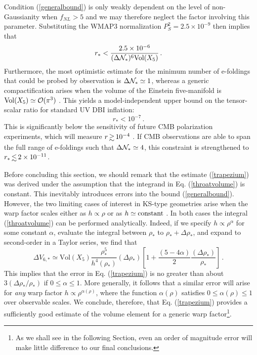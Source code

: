Condition (\ref{generalbound}) is 
only weakly dependent on the level of non-Gaussianity 
when $f_{NL} > 5$ and we may therefore neglect the 
factor involving this parameter. Substituting the WMAP3 normalization 
$P_S^2 = 2.5 \times 10^{-9}$ then implies that 
\begin{equation}
\label{upperbound}
r_{*} < \frac{2.5\times 10^{-6}}{( \Delta {\cal{N}}_*)^6 \mathrm{Vol}(X_5)} \,.
\end{equation}
Furthermore, the most optimistic 
estimate for the minimum number of e-foldings that could be 
probed by observation is $\Delta {\cal{N}}_{*} \simeq 1$, whereas
a generic compactification arises when 
the volume of the Einstein five-manifold is $\mathrm{Vol}(X_5) 
\simeq {\cal{O}} (\pi^3)$ \cite{ks}. This yields a model-independent 
upper bound on the tensor-scalar ratio for standard UV DBI inflation:   
\begin{equation}
\label{standardbound}
r_* < 10^{-7} \,.
\end{equation}
This is significantly below the sensitivity 
of future CMB polarization experiments, which will measure 
${r} \, {\gsim} \, 10^{-4}$ \cite{clover,vpj}. If CMB  
observations are able to span the full range of e-foldings such that
$\Delta {\cal{N}}_* \simeq 4$, this constraint is strengthened to 
${r_*} \, {\lsim} \, {2 \times 10^{-11}}$.

Before concluding this section, we should remark that 
the estimate (\ref{trapezium}) was derived under the assumption  
that the integrand in Eq. (\ref{throatvolume})  
is constant. This inevitably introduces errors into the bound
(\ref{generalbound}). However, the two limiting cases of interest 
in KS-type geometries arise 
when the warp factor scales either as $h \propto \rho$
or as $h \simeq {\rm constant}$ \cite{ks,kt}. In both cases
the integral (\ref{throatvolume}) can be performed analytically. 
Indeed, if we specify $h \propto \rho^{\alpha}$ for some constant $\alpha$,  
evaluate the integral between $\rho_{*}$ 
to $\rho_{*}+\Delta \rho_{*}$, and expand to second-order in a 
Taylor series, we find that  
\begin{equation}
\label{limits}
\Delta V_{6,*} \simeq \mathrm{Vol}(X_5) \frac{\rho^5_{*}}{h^{4} 
(\rho_{*} )}(\Delta \rho_*) 
\left[ 1 +\frac{(5-4 \alpha )}{2} 
\frac{(\Delta \rho_*)}{\rho_{*}} \right]  \,.
\end{equation}
This implies that the error in Eq. (\ref{trapezium}) 
is no greater than 
about $3 (\Delta \rho_* / \rho_*)$ if  
$0 \le \alpha \le 1$. More generally, it follows that a similar
error will arise for {\em any} warp factor 
$h \propto \rho^{\alpha (\rho )}$, where the function 
$\alpha (\rho)$ satisfies $0 \le \alpha (\rho ) \le 1$ 
over observable scales. 
We conclude, therefore, that Eq. (\ref{trapezium}) 
provides a sufficiently good estimate of the volume element  
for a generic warp factor\footnote{As we shall see in the following Section, 
even an order of magnitude error will make little 
difference to our final conclusions.}.  
% 
% 
% 
% 
